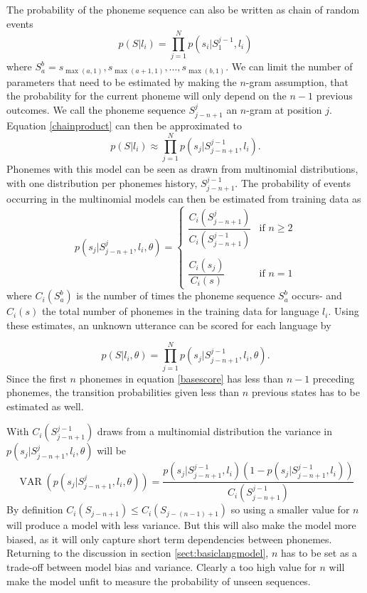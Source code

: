The probability of the phoneme sequence can also be written as chain of random events
\begin{equation}
\label{chainproduct}
p(S|l_i) = \prod_{j=1}^Np(s_i|S_1^{j-1}, l_i)
\end{equation}
where $S_a^b = s_{\max(a,1)}, s_{\max(a+1,1)}, ... , s_{\max(b, 1)}$. We can limit the number of parameters that need to be estimated by making the $n$-gram assumption, that the probability for the current phoneme will only depend on the $n-1$ previous outcomes. We call the phoneme sequence $S_{j-n+1}^j$ an $n$-gram at position $j$. Equation \ref{chainproduct} can then be approximated to
\begin{equation}
\label{markovchain}
p(S|l_i) \approx \prod_{j=1}^Np(s_j|S_{j-n+1}^{j-1},l_i).
\end{equation}
Phonemes with this model can be seen as drawn from multinomial distributions, with one distribution per phonemes history, $S_{j-n+1}^{j-1}$. The probability of events occurring in the multinomial models can then be estimated from training data as
\begin{equation}
\label{baselinetrain}
p(s_j|S_{j-n+1}^j, l_i, \theta) = 
\begin{cases} 
\dfrac{C_i(S_{j-n+1}^j)}{C_i(S_{j-n+1}^{j-1})} & \text{if $n \geq 2$} \\ \\
\dfrac{C_i(s_j)}{C_i(s)} & \text{if $n = 1$}
\end{cases}
\end{equation}
where $C_i(S_a^b)$ is the number of times the phoneme sequence $S_a^b$ occurs- and $C_i(s)$ the total number of phonemes in the training data for language $l_i$. Using these estimates, an unknown utterance can be scored for each language by

\begin{equation}
\label{basescore}
p(S|l_i, \theta) = \prod_{j=1}^Np(s_j|S_{j-n+1}^{j-1}, l_i, \theta).
\end{equation}
Since the first $n$ phonemes in equation \ref{basescore} has less than $n-1$ preceding phonemes, the transition probabilities given less than $n$ previous states has to be estimated as well.

With $C_i(S_{j-n+1}^{j-1})$ draws from a multinomial distribution the variance in $p(s_j|S_{j-n+1}^j, l_i, \theta)$ will be
\begin{equation}
\label{baselinevar}
\operatorname{VAR}(p(s_j|S_{j-n+1}^j, l_i, \theta)) = \frac{p(s_j|S_{j-n+1}^{j-1}, l_i)(1-p(s_j|S_{j-n+1}^{j-1}, l_i))}{C_i(S_{j-n+1}^{j-1})}
\end{equation}
 By definition $C_i(S_{j-n+1}) \leq C_i(S_{j-(n-1)+1})$ so using a smaller value for $n$ will produce a model with less variance. But this will also make the model more biased, as it will only capture short term dependencies between phonemes. Returning to the discussion in section \ref{sect:basiclangmodel}, $n$ has to be set as a trade-off between model bias and variance. Clearly a too high value for $n$ will make the model unfit to measure the probability of unseen sequences.

